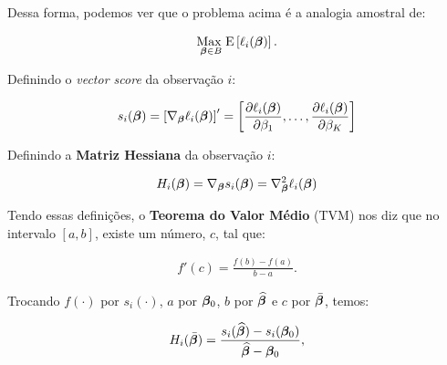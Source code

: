 \documentclass[11pt, oneside, a4paper, article]{article}
\numberwithin{equation}{section}
\begin{document}
\begin{description}
	Dessa forma, podemos ver que o problema acima é a analogia amostral de:

	\vspace{-1 em}
	\begin{align*}
		\underset{\boldsymbol{\beta} \in B}{\text{Max }} 
		\text{E} \left[ 
			\ell_{i} ( \boldsymbol{\beta} )
		\right].
	\end{align*}

	Definindo o \textit{vector score} da observação $i$:

	\vspace{-1 em}
	\begin{align*}
		s_{i} (\boldsymbol{\beta}) = 
		\left[ \nabla_{\boldsymbol{\beta}} \ell_{i} (\boldsymbol{\beta}) \right]'
		=
		\begin{bmatrix}
			\dfrac{\partial{\ell_{i} (\ensuremath{\boldsymbol{\beta}})}}{\partial{\beta_{1}}},
			\dots,
			\dfrac{\partial{\ell_{i} (\ensuremath{\boldsymbol{\beta}})}}{\partial{\beta_{K}}}
		\end{bmatrix}
	\end{align*}

	Definindo a \textbf{Matriz Hessiana} da observação $i$:

	\vspace{-1 em}
	\begin{align*}
		H_{i} (\boldsymbol{\beta}) = 
		\nabla_{\boldsymbol{\beta}} s_{i} (\boldsymbol{\beta}) = 
		\nabla_{\boldsymbol{\beta}}^2 \ell_{i} (\boldsymbol{\beta})
	\end{align*}

	Tendo essas definições, o \textbf{Teorema do Valor Médio} (TVM) nos diz que no intervalo $[a, b]$, existe um número, $c$, tal que:

	\vspace{-1 em}
	\begin{align*}
		f'(c) = \frac{f(b) - f(a)}{b - a}.
	\end{align*}

	\vspace{1 em}
	\begin{center}
	\end{center}
	\vspace{1 em}

	Trocando 
	$f(\cdot)$ por $s_{i}(\cdot)$, 
	$a$ por $\boldsymbol{\beta}_{0}$, 
	$b$ por $\widehat{\boldsymbol{\beta}}$ e
	$c$ por $\bar{\boldsymbol{\beta}}$,
	temos:

	\vspace{-1 em}
	\begin{align*}
		H_{i} ( \bar{\boldsymbol{\beta}} ) =
		\frac{s_{i}( \widehat{\boldsymbol{\beta}} ) - s_{i}( \boldsymbol{\beta}_{0} )}{\widehat{\boldsymbol{\beta}} - \boldsymbol{\beta}_{0}},
	\end{align*}


\end{description}
\end{document}

